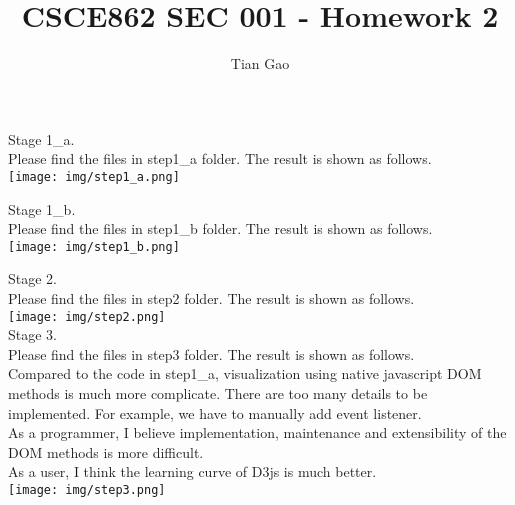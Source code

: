 \documentclass[a4paper]{article}
\title{CSCE862 SEC 001 - Homework 2}
\author{Tian Gao}
\begin{document}
\maketitle

Stage 1\_a.\\
Please find the files in step1\_a folder. The result is shown as follows.\\
\texttt{[image: img/step1\_a.png]}

Stage 1\_b.\\
Please find the files in step1\_b folder. The result is shown as follows.\\
\texttt{[image: img/step1\_b.png]}

Stage 2.\\
Please find the files in step2 folder. The result is shown as follows.\\
\texttt{[image: img/step2.png]}\\

Stage 3.\\
Please find the files in step3 folder. The result is shown as follows.\\
Compared to the code in step1\_a, visualization using native javascript DOM methods is much more complicate. 
There are too many details to be implemented. 
For example, we have to manually add event listener. \\
As a programmer, I believe implementation, maintenance and extensibility of the DOM methods is more difficult.\\
As a user, I think the learning curve of D3js is much better.\\
\texttt{[image: img/step3.png]}\\
\end{document}
